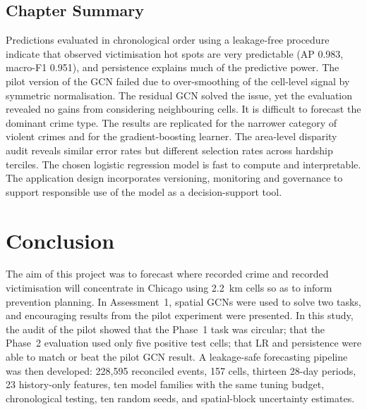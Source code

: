 \documentclass[11pt,a4paper]{report}
\begin{document}
\section{Chapter Summary}
Predictions evaluated in chronological order using a leakage-free procedure indicate that observed victimisation hot spots are very predictable (AP 0.983, macro-F1 0.951), and persistence explains much of the predictive power. The pilot version of the GCN failed due to over-smoothing of the cell-level signal by symmetric normalisation. The residual GCN solved the issue, yet the evaluation revealed no gains from considering neighbouring cells. It is difficult to forecast the dominant crime type. The results are replicated for the narrower category of violent crimes and for the gradient-boosting learner. The area-level disparity audit reveals similar error rates but different selection rates across hardship terciles. The chosen logistic regression model is fast to compute and interpretable. The application design incorporates versioning, monitoring and governance to support responsible use of the model as a decision-support tool.
\chapter{Conclusion}
\label{ch:conc}
The aim of this project was to forecast where recorded crime and recorded victimisation will concentrate in Chicago using 2.2~km cells so as to inform prevention planning. In Assessment~1, spatial GCNs were used to solve two tasks, and encouraging results from the pilot experiment were presented. In this study, the audit of the pilot showed that the Phase~1 task was circular; that the Phase~2 evaluation used only five positive test cells; that LR and persistence were able to match or beat the pilot GCN result. A leakage-safe forecasting pipeline was then developed: 228,595 reconciled events, 157 cells, thirteen 28-day periods, 23 history-only features, ten model families with the same tuning budget, chronological testing, ten random seeds, and spatial-block uncertainty estimates.
\end{document}
